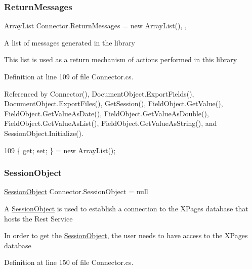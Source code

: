 \subsubsection{\texorpdfstring{Return\+Messages}{ReturnMessages}}
{\footnotesize\ttfamily Array\+List Connector.\+Return\+Messages = new Array\+List()\hspace{0.3cm}{\ttfamily [static]}, {\ttfamily [get]}, {\ttfamily [set]}}



A list of messages generated in the library 

This list is used as a return mechanism of actions performed in this library

Definition at line 109 of file Connector.\+cs.



Referenced by Connector(), Document\+Object.\+Export\+Fields(), Document\+Object.\+Export\+Files(), Get\+Session(), Field\+Object.\+Get\+Value(), Field\+Object.\+Get\+Value\+As\+Date(), Field\+Object.\+Get\+Value\+As\+Double(), Field\+Object.\+Get\+Value\+As\+List(), Field\+Object.\+Get\+Value\+As\+String(), and Session\+Object.\+Initialize().


\begin{DoxyCode}
109 \{ \textcolor{keyword}{get}; \textcolor{keyword}{set}; \} = \textcolor{keyword}{new} ArrayList();
\end{DoxyCode}
\mbox{\label{class_connector_a0a7bb42f9530796c086ab50785147ce9}} 
\subsubsection{\texorpdfstring{Session\+Object}{SessionObject}}
{\footnotesize\ttfamily \mbox{\hyperlink{class_session_object}{Session\+Object}} Connector.\+Session\+Object = null\hspace{0.3cm}{\ttfamily [get]}}



A \mbox{\hyperlink{class_session_object}{Session\+Object}} is used to establish a connection to the X\+Pages database that hosts the Rest Service 

In order to get the \mbox{\hyperlink{class_session_object}{Session\+Object}}, the user needs to have access to the X\+Pages database

Definition at line 150 of file Connector.\+cs.



